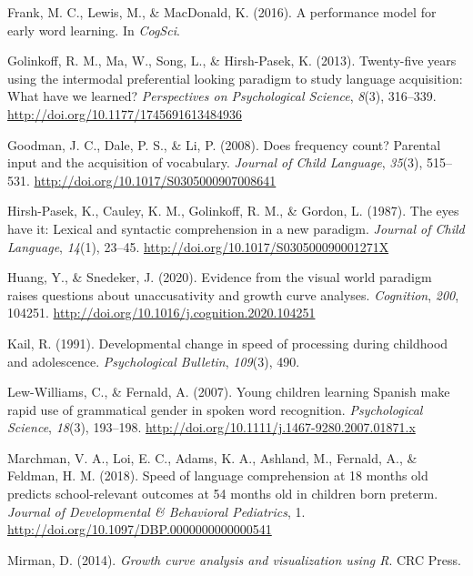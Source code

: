\documentclass[10pt, letterpaper]{article}
\begin{document}
\leavevmode\hypertarget{ref-frank2016b}{}%
Frank, M. C., Lewis, M., \& MacDonald, K. (2016). A performance model
for early word learning. In \emph{CogSci}.

\leavevmode\hypertarget{ref-Golinkoff2013}{}%
Golinkoff, R. M., Ma, W., Song, L., \& Hirsh-Pasek, K. (2013).
Twenty-five years using the intermodal preferential looking paradigm to
study language acquisition: What have we learned? \emph{Perspectives on
Psychological Science}, \emph{8}(3), 316--339.
\url{http://doi.org/10.1177/1745691613484936}

\leavevmode\hypertarget{ref-Goodman2008}{}%
Goodman, J. C., Dale, P. S., \& Li, P. (2008). Does frequency count?
Parental input and the acquisition of vocabulary. \emph{Journal of Child
Language}, \emph{35}(3), 515--531.
\url{http://doi.org/10.1017/S0305000907008641}

\leavevmode\hypertarget{ref-Hirsh-Pasek1987}{}%
Hirsh-Pasek, K., Cauley, K. M., Golinkoff, R. M., \& Gordon, L. (1987).
The eyes have it: Lexical and syntactic comprehension in a new paradigm.
\emph{Journal of Child Language}, \emph{14}(1), 23--45.
\url{http://doi.org/10.1017/S030500090001271X}

\leavevmode\hypertarget{ref-Huang2020}{}%
Huang, Y., \& Snedeker, J. (2020). Evidence from the visual world
paradigm raises questions about unaccusativity and growth curve
analyses. \emph{Cognition}, \emph{200}, 104251.
\url{http://doi.org/10.1016/j.cognition.2020.104251}

\leavevmode\hypertarget{ref-kail1991}{}%
Kail, R. (1991). Developmental change in speed of processing during
childhood and adolescence. \emph{Psychological Bulletin}, \emph{109}(3),
490.

\leavevmode\hypertarget{ref-Lew-Williams2007}{}%
Lew-Williams, C., \& Fernald, A. (2007). Young children learning Spanish
make rapid use of grammatical gender in spoken word recognition.
\emph{Psychological Science}, \emph{18}(3), 193--198.
\url{http://doi.org/10.1111/j.1467-9280.2007.01871.x}

\leavevmode\hypertarget{ref-Marchman2018}{}%
Marchman, V. A., Loi, E. C., Adams, K. A., Ashland, M., Fernald, A., \&
Feldman, H. M. (2018). Speed of language comprehension at 18 months old
predicts school-relevant outcomes at 54 months old in children born
preterm. \emph{Journal of Developmental \& Behavioral Pediatrics}, 1.
\url{http://doi.org/10.1097/DBP.0000000000000541}

\leavevmode\hypertarget{ref-Mirman2014}{}%
Mirman, D. (2014). \emph{Growth curve analysis and visualization using
R}. CRC Press.
\end{document}
